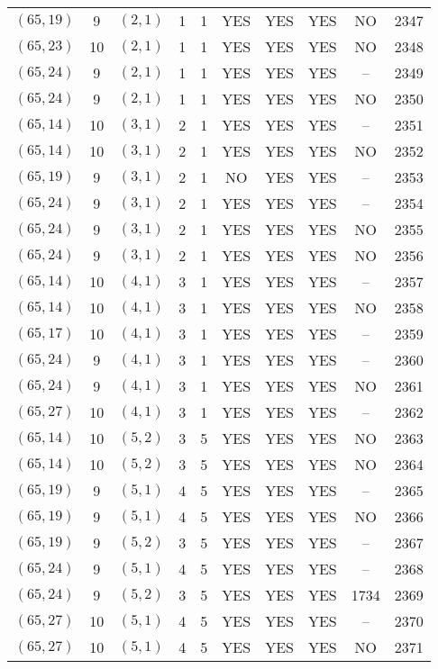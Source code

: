 \begin{longtable}{|c|c|c|c|c|c|c|c|c|c|}
$(65, 19)$ & 9 & $(2, 1)$ & 1 & 1 & YES & YES & YES & NO & 2347\\
$(65, 23)$ & 10 & $(2, 1)$ & 1 & 1 & YES & YES & YES & NO & 2348\\
$(65, 24)$ & 9 & $(2, 1)$ & 1 & 1 & YES & YES & YES & -- & 2349\\
$(65, 24)$ & 9 & $(2, 1)$ & 1 & 1 & YES & YES & YES & NO & 2350\\
$(65, 14)$ & 10 & $(3, 1)$ & 2 & 1 & YES & YES & YES & -- & 2351\\
$(65, 14)$ & 10 & $(3, 1)$ & 2 & 1 & YES & YES & YES & NO & 2352\\
$(65, 19)$ & 9 & $(3, 1)$ & 2 & 1 & NO & YES & YES & -- & 2353\\
$(65, 24)$ & 9 & $(3, 1)$ & 2 & 1 & YES & YES & YES & -- & 2354\\
$(65, 24)$ & 9 & $(3, 1)$ & 2 & 1 & YES & YES & YES & NO & 2355\\
$(65, 24)$ & 9 & $(3, 1)$ & 2 & 1 & YES & YES & YES & NO & 2356\\
$(65, 14)$ & 10 & $(4, 1)$ & 3 & 1 & YES & YES & YES & -- & 2357\\
$(65, 14)$ & 10 & $(4, 1)$ & 3 & 1 & YES & YES & YES & NO & 2358\\
$(65, 17)$ & 10 & $(4, 1)$ & 3 & 1 & YES & YES & YES & -- & 2359\\
$(65, 24)$ & 9 & $(4, 1)$ & 3 & 1 & YES & YES & YES & -- & 2360\\
$(65, 24)$ & 9 & $(4, 1)$ & 3 & 1 & YES & YES & YES & NO & 2361\\
$(65, 27)$ & 10 & $(4, 1)$ & 3 & 1 & YES & YES & YES & -- & 2362\\
$(65, 14)$ & 10 & $(5, 2)$ & 3 & 5 & YES & YES & YES & NO & 2363\\
$(65, 14)$ & 10 & $(5, 2)$ & 3 & 5 & YES & YES & YES & NO & 2364\\
$(65, 19)$ & 9 & $(5, 1)$ & 4 & 5 & YES & YES & YES & -- & 2365\\
$(65, 19)$ & 9 & $(5, 1)$ & 4 & 5 & YES & YES & YES & NO & 2366\\
$(65, 19)$ & 9 & $(5, 2)$ & 3 & 5 & YES & YES & YES & -- & 2367\\
$(65, 24)$ & 9 & $(5, 1)$ & 4 & 5 & YES & YES & YES & -- & 2368\\
$(65, 24)$ & 9 & $(5, 2)$ & 3 & 5 & YES & YES & YES & 1734 & 2369\\
$(65, 27)$ & 10 & $(5, 1)$ & 4 & 5 & YES & YES & YES & -- & 2370\\
$(65, 27)$ & 10 & $(5, 1)$ & 4 & 5 & YES & YES & YES & NO & 2371\\

\end{longtable}
